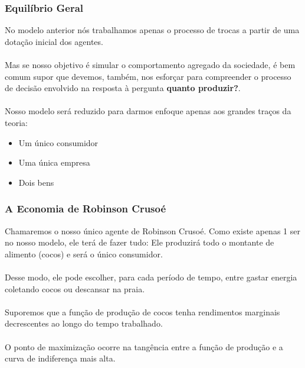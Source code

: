 \documentclass{beamer}[10]
\begin{document}
\begin{frame}
	\frametitle{Equilíbrio Geral}

	No modelo anterior nós trabalhamos apenas o processo de trocas a partir de uma dotação inicial dos agentes.
	\\~\\
	Mas se nosso objetivo é simular o comportamento agregado da sociedade, é bem comum supor que devemos, também, nos esforçar para compreender o processo de decisão envolvido na resposta à pergunta \textbf{quanto produzir?}.
	\\~\\
	Nosso modelo será reduzido para darmos enfoque apenas aos grandes traços da teoria:
	\begin{itemize}
		\item Um único consumidor
		\item Uma única empresa
		\item Dois bens
	\end{itemize}

\end{frame}

\begin{frame}
	\frametitle{A Economia de Robinson Crusoé}

	Chamaremos o nosso único agente de Robinson Crusoé. Como existe apenas 1 ser no nosso modelo, ele terá de fazer tudo: Ele produzirá todo o montante de alimento (cocos) e será o único consumidor.
	\\~\\
	Desse modo, ele pode escolher, para cada período de tempo, entre gastar energia coletando cocos ou descansar na praia.
	\\~\\
	Suporemos que a função de produção de cocos tenha rendimentos marginais decrescentes ao longo do tempo trabalhado.
	\\~\\
	O ponto de maximização ocorre na tangência entre a função de produção e a curva de indiferença mais alta.

\end{frame}
\end{document}
